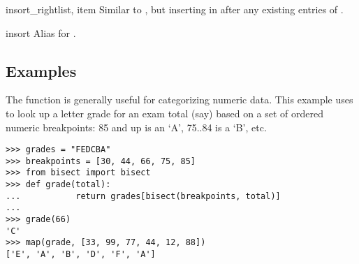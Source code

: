 \begin{funcdesc}{insort_right}{list, item}
  Similar to , but inserting  in
   after any existing entries of .
\end{funcdesc}

\begin{funcdesc}{insort}{\unspecified}
  Alias for .
\end{funcdesc}


\subsection{Examples}

The  function is generally useful for categorizing
numeric data.  This example uses  to look up a
letter grade for an exam total (say) based on a set of ordered numeric
breakpoints: 85 and up is an `A', 75..84 is a `B', etc.

\begin{verbatim}
>>> grades = "FEDCBA"
>>> breakpoints = [30, 44, 66, 75, 85]
>>> from bisect import bisect
>>> def grade(total):
...           return grades[bisect(breakpoints, total)]
...
>>> grade(66)
'C'
>>> map(grade, [33, 99, 77, 44, 12, 88])
['E', 'A', 'B', 'D', 'F', 'A']

\end{verbatim}
